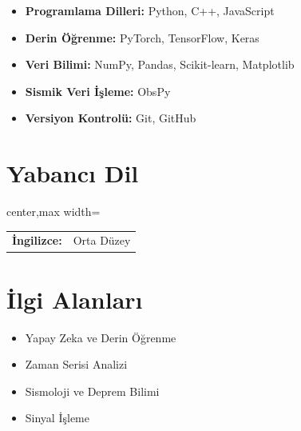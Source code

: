 \begin{itemize}
    \item \textbf{Programlama Dilleri:} Python, C++, JavaScript
    \item \textbf{Derin Öğrenme:} PyTorch, TensorFlow, Keras
    \item \textbf{Veri Bilimi:} NumPy, Pandas, Scikit-learn, Matplotlib
    \item \textbf{Sismik Veri İşleme:} ObsPy
    \item \textbf{Versiyon Kontrolü:} Git, GitHub
\end{itemize}

\section*{Yabancı Dil}

\begin{adjustbox}{center,max width=\textwidth}
\begin{tabular}{ll}
\textbf{İngilizce:} & Orta Düzey \\
\end{tabular}
\end{adjustbox}

\section*{İlgi Alanları}

\begin{itemize}
    \item Yapay Zeka ve Derin Öğrenme
    \item Zaman Serisi Analizi
    \item Sismoloji ve Deprem Bilimi
    \item Sinyal İşleme
\end{itemize}

